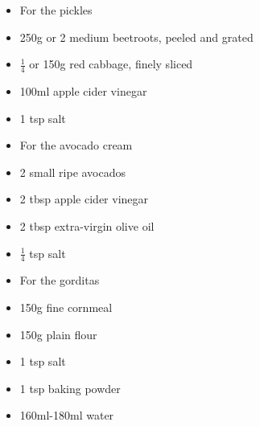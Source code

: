 \documentclass{book}
\begin{document}
\begin{itemize}
\item For the pickles
\item 250g or 2 medium beetroots, peeled and grated
\item $\frac{1}{4}$ or 150g red cabbage, finely sliced
\item 100ml apple cider vinegar
\item 1 tsp salt
\end{itemize}

\begin{itemize}
\item For the avocado cream
\item 2 small ripe avocados
\item 2 tbsp apple cider vinegar 
\item 2 tbsp extra-virgin olive oil
\item $\frac{1}{4}$ tsp salt
\end{itemize}

\begin{itemize}
\item For the gorditas
\item 150g fine cornmeal
\item 150g plain flour
\item 1 tsp salt
\item 1 tsp baking powder
\item 160ml-180ml water
\end{itemize}
\end{document}
